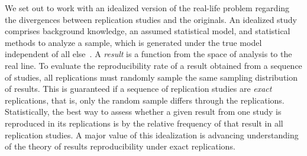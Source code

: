 \documentclass[meta,authordate]{jote-new-article}
\newcounter{result}
\begin{document}
We set out to work with an idealized version of the real-life problem regarding the divergences between replication studies and the originals. An idealized study comprises background knowledge, an assumed statistical model, and statistical methods to analyze a sample, which is  generated under the true model independent of all else~\parencite{Devezer2021}. A {\em result} is a function from the space of analysis to the real line. To evaluate the reproducibility rate of a result obtained from a sequence of studies, all replications must randomly sample the same sampling distribution of results. This is guaranteed if a sequence of replication studies are {\em exact} replications, that is, only the random sample differs through the replications. Statistically, the best way to assess whether a given result from one study is reproduced in its replications is by the relative frequency of that result in all replication studies. A major value of this idealization is advancing understanding of the theory of results reproducibility under exact replications.
\end{document}
